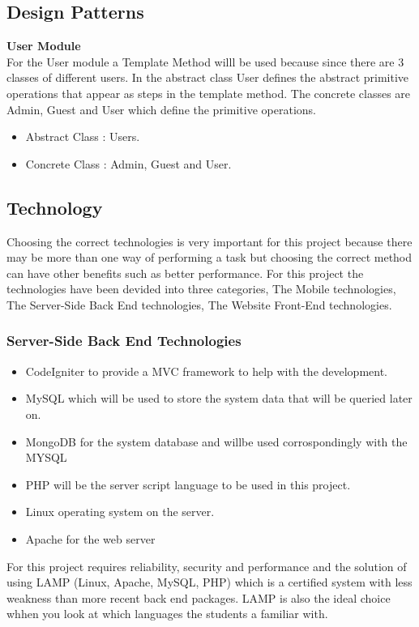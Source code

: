 \documentclass[a4paper,12pt]{report}
\begin{document}
	\newpage

\newpage
\subsection{Design Patterns}
\textbf{User Module}\\	
	For the User module a Template Method willl be used because since there are 3 classes of different users. In the abstract class User defines the abstract primitive operations that appear as steps in the template method. The concrete classes are Admin, Guest and User which define the primitive operations.
	\begin{itemize}
		\item Abstract Class : Users.
		\item Concrete Class : Admin, Guest and User.
	\end{itemize}
\newpage
\subsection{Technology}
Choosing the correct technologies is very important for this project because there may be  more than one way of performing a task but choosing the correct method can have other benefits such as better performance.
For this project the technologies have been devided into three categories, The Mobile technologies, The Server-Side Back End technologies, The Website Front-End technologies.
\subsubsection{Server-Side Back End Technologies}
\begin{itemize}
	\item CodeIgniter to provide a MVC framework to help with the development.
	\item MySQL which will be used to store the system data that will be queried later on.
	\item MongoDB for the system database and willbe used corrospondingly with the MYSQL
	\item PHP will be the server script language to be used in this project.
	\item Linux operating system on the server.
	\item Apache for the web server 
\end{itemize}
For this project requires reliability, security and performance and the solution of using LAMP (Linux, Apache, MySQL, PHP) which is a certified system with less weakness than more recent back end packages. LAMP  is also the ideal choice whhen you look at which languages the students a familiar with.
\end{document}
